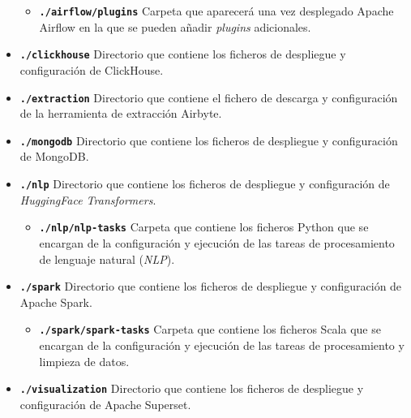 \begin{itemize}
\begin{itemize}
        \item \textbf{\texttt{./airflow/plugins}} Carpeta que aparecerá una vez desplegado Apache Airflow en la que se pueden añadir \textit{plugins} adicionales.
    \end{itemize}

    \item \textbf{\texttt{./clickhouse}} Directorio que contiene los ficheros de despliegue y configuración de ClickHouse.

    \item \textbf{\texttt{./extraction}} Directorio que contiene el fichero de descarga y configuración de la herramienta de extracción Airbyte.

    \item \textbf{\texttt{./mongodb}} Directorio que contiene los ficheros de despliegue y configuración de MongoDB.

    \item \textbf{\texttt{./nlp}} Directorio que contiene los ficheros de despliegue y configuración de \textit{HuggingFace Transformers}.

    \begin{itemize}
        \item \textbf{\texttt{./nlp/nlp-tasks}} Carpeta que contiene los ficheros Python que se encargan de la configuración y ejecución de las tareas de procesamiento de lenguaje natural (\textit{NLP}).
    \end{itemize}

    \item \textbf{\texttt{./spark}} Directorio que contiene los ficheros de despliegue y configuración de Apache Spark.

    \begin{itemize}
        \item \textbf{\texttt{./spark/spark-tasks}} Carpeta que contiene los ficheros Scala que se encargan de la configuración y ejecución de las tareas de procesamiento y limpieza de datos.
    \end{itemize}

    \item \textbf{\texttt{./visualization}} Directorio que contiene los ficheros de despliegue y configuración de Apache Superset.


\end{itemize}

